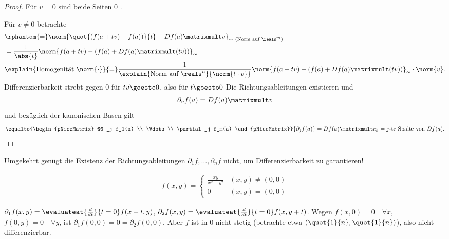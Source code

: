 \begin{proof}
    Für \( v=0 \) sind beide Seiten \( 0 \) \checkmark.

    Für \( v\neq 0 \) betrachte
    \begin{align*}
        \begin{aligned}[t]
            &\rphantom{=}\norm{\quot{(f(a+tv)-f(a))}{t}-Df(a)\matrixmult v}_{\sim\ (\text{Norm auf \( \reals^m \)})}\\
            &=\frac{1}{\abs{t}}\norm{f(a+tv)-(f(a)+Df(a)\matrixmult(tv))}_{\sim}\\
            &\explain{\text{Homogenität }\norm{\cdot}}{=}\frac{1}{\explain{\text{Norm auf \( \reals^n \)}}{\norm{t\cdot v}}}\norm{f(a+tv)-(f(a)+Df(a)\matrixmult(tv))}_{\sim}\cdot\norm{v}.
        \end{aligned}
    \end{align*}
    Differenzierbarkeit \timplies strebt gegen \( 0 \) für \( tv\goesto 0 \), also für \( t\goesto 0 \) \timplies Die Richtungsableitungen existieren und 
    \begin{align*}
        \partial_v f(a)=Df(a)\matrixmult v
    \end{align*}
    und bezüglich der kanonischen Basen gilt
    \begin{align*}
        \equalto{\begin{pNiceMatrix} @6
        _j f_1(a) \\ \Vdots \\ \partial_j f_m(a) \end{pNiceMatrix}}{\partial_j f(a)}=Df(a)\matrixmult e_k=j \text{-te Spalte von \( Df(a) \)}.
    \end{align*}
\end{proof}
\begin{achtung*}
    Umgekehrt genügt die Existenz der Richtungsableitungen \( \partial_1 f,\dotsc, \partial_n f \) nicht, um Differenzierbarkeit zu garantieren!
    \begin{beispiel*}
        \begin{align*}
            f(x,y)=\begin{cases}
                \frac{xy}{x^2+y^2}&(x,y)\neq (0,0)\\
                0 &(x,y)=(0,0)
            \end{cases}
        \end{align*}
    \end{beispiel*}
    \( \partial_1 f(x,y)=\evaluateat{\frac{d}{dt}}{t=0}f(x+t,y) \), \( \partial_2 f(x,y)=\evaluateat{\frac{d}{dt}}{t=0} f(x,y+t) \). Wegen \( f(x,0)=0 \quad \forall x \), \( f(0,y)=0\quad \forall y \), ist \( \partial_1 f(0,0)=0=\partial_2 f(0,0) \). Aber \( f  \) ist in \( 0 \) nicht stetig (betrachte etwa \( (\quot{1}{n},\quot{1}{n}) \)), also nicht differenzierbar.
    
\end{achtung*}




